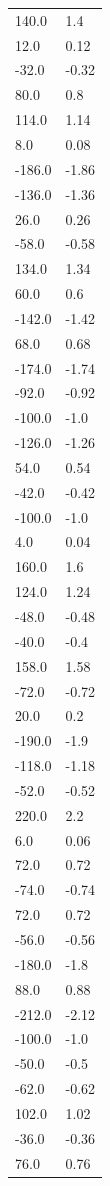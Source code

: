 \begin{longtable}{ll}
140.0 & 1.4 \\
12.0 & 0.12 \\
-32.0 & -0.32 \\
80.0 & 0.8 \\
114.0 & 1.14 \\
8.0 & 0.08 \\
-186.0 & -1.86 \\
-136.0 & -1.36 \\
26.0 & 0.26 \\
-58.0 & -0.58 \\
134.0 & 1.34 \\
60.0 & 0.6 \\
-142.0 & -1.42 \\
68.0 & 0.68 \\
-174.0 & -1.74 \\
-92.0 & -0.92 \\
-100.0 & -1.0 \\
-126.0 & -1.26 \\
54.0 & 0.54 \\
-42.0 & -0.42 \\
-100.0 & -1.0 \\
4.0 & 0.04 \\
160.0 & 1.6 \\
124.0 & 1.24 \\
-48.0 & -0.48 \\
-40.0 & -0.4 \\
158.0 & 1.58 \\
-72.0 & -0.72 \\
20.0 & 0.2 \\
-190.0 & -1.9 \\
-118.0 & -1.18 \\
-52.0 & -0.52 \\
220.0 & 2.2 \\
6.0 & 0.06 \\
72.0 & 0.72 \\
-74.0 & -0.74 \\
72.0 & 0.72 \\
-56.0 & -0.56 \\
-180.0 & -1.8 \\
88.0 & 0.88 \\
-212.0 & -2.12 \\
-100.0 & -1.0 \\
-50.0 & -0.5 \\
-62.0 & -0.62 \\
102.0 & 1.02 \\
-36.0 & -0.36 \\
76.0 & 0.76 \\

\end{longtable}

